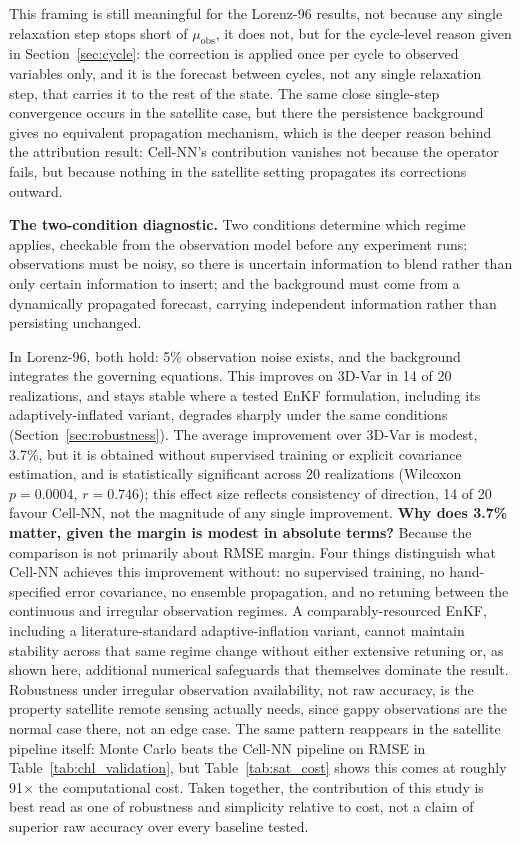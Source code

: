 \documentclass[final,5p,times,twocolumn,authoryear]{elsarticle}
\begin{document}
This framing is still meaningful for the Lorenz-96 results, not
because any single relaxation step stops short of $\mu_\text{obs}$,
it does not, but for the cycle-level reason given in
Section~\ref{sec:cycle}: the correction is applied once per cycle to
observed variables only, and it is the forecast between cycles, not
any single relaxation step, that carries it to the rest of the state.
The same close single-step convergence occurs in the satellite case,
but there the persistence background gives no equivalent propagation
mechanism, which is the deeper reason behind the attribution result:
Cell-NN's contribution vanishes not because the operator fails, but
because nothing in the satellite setting propagates its corrections
outward.

\textbf{The two-condition diagnostic.} Two conditions determine which
regime applies, checkable from the observation model before any
experiment runs: observations must be noisy, so there is uncertain
information to blend rather than only certain information to insert;
and the background must come from a dynamically propagated forecast,
carrying independent information rather than persisting unchanged.

In Lorenz-96, both hold: 5\% observation noise exists, and the
background integrates the governing equations. This improves on
3D-Var in 14 of 20 realizations, and stays stable where a tested EnKF
formulation, including its adaptively-inflated variant, degrades
sharply under the same conditions (Section~\ref{sec:robustness}).
The average improvement over 3D-Var is modest, 3.7\%, but it is
obtained without supervised training or explicit covariance
estimation, and is statistically significant across 20 realizations
(Wilcoxon $p=0.0004$, $r=0.746$); this effect size reflects
consistency of direction, 14 of 20 favour Cell-NN, not the
magnitude of any single improvement. \textbf{Why does 3.7\% matter,
given the margin is modest in absolute terms?} Because the comparison
is not primarily about RMSE margin. Four things distinguish what
Cell-NN achieves this improvement without: no supervised training, no
hand-specified error covariance, no ensemble propagation, and no
retuning between the continuous and irregular observation regimes. A
comparably-resourced EnKF, including a literature-standard
adaptive-inflation variant, cannot maintain stability across that same
regime change without either extensive retuning or, as shown here,
additional numerical safeguards that themselves dominate the result.
Robustness under irregular observation availability, not raw
accuracy, is the property satellite remote sensing actually needs,
since gappy observations are the normal case there, not an edge case.
The same pattern reappears in the satellite pipeline itself: Monte
Carlo beats the Cell-NN pipeline on RMSE in
Table~\ref{tab:chl_validation}, but Table~\ref{tab:sat_cost} shows
this comes at roughly 91$\times$ the computational cost. Taken
together, the contribution of this study is best read as one of
robustness and simplicity relative to cost, not a claim of superior
raw accuracy over every baseline tested.
\end{document}
